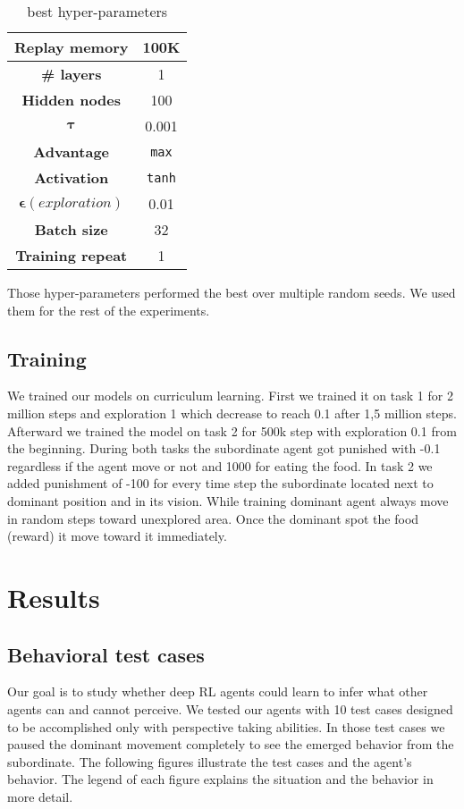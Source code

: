 \documentclass{article}
\begin{document}
\begin{table}[H]
    \centering
    \begin{tabular}{*{2}{|c|}}
    \hline
         \textbf{Replay memory}& 100K\\
         \hline
         \textbf {\# layers }&1\\
         \hline
         \textbf {Hidden nodes}&100\\
         \hline
         \(\boldsymbol{\tau}\)&0.001\\
         \hline
         \textbf {Advantage}&\texttt{max} \\
         \hline
         \textbf {Activation}&\texttt{tanh}\\
         \hline
         \(\boldsymbol{\epsilon}(exploration)\)&0.01\\
         \hline
         \textbf {Batch size}&32\\
         \hline
         \textbf {Training repeat} &1\\
    \hline
    \end{tabular}
    \caption{best hyper-parameters}
    \label{tab:best.hyp}
\end{table}

Those hyper-parameters performed the best over multiple random seeds. We used them for the rest of the experiments.

\subsection{Training}
We trained our models on curriculum learning. First we trained it on task 1 for 2 million steps and exploration 1 which decrease to reach 0.1 after 1,5 million steps. Afterward we trained the model on task 2 for 500k step with exploration 0.1 from the beginning. During both tasks the subordinate agent got punished with -0.1 regardless if the agent move or not and 1000 for eating the food. In task 2 we added punishment of -100 for every time step the subordinate located next to dominant position and in its vision. While training dominant agent always move in random steps toward unexplored area. Once the dominant spot the food (reward) it move toward it immediately.

\section{Results}

\subsection{Behavioral test cases}
Our goal is to study whether deep RL agents could learn to infer what other agents can and cannot perceive. We tested our agents with 10 test cases designed to be accomplished only with perspective taking abilities. In those test cases we paused the dominant movement completely to see the emerged behavior from the subordinate. The following figures illustrate the test cases and the agent's behavior. The legend of each figure explains the situation and the behavior in more detail.
\end{document}
